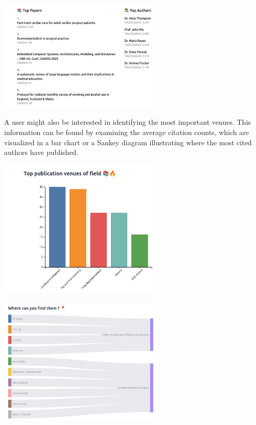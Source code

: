 \documentclass{article}
\begin{document}
\begin{center}
\includegraphics[width=0.6\textwidth]{./pictures/top_papers_top_authors.png}
\end{center}

A user might also be interested in identifying the most important venues.
This information can be found by examining the average citation counts,
which are visualized in a bar chart or a Sankey diagram illustrating where the most cited authors have published.
\begin{center}
\includegraphics[width=0.6\textwidth]{./pictures/top_publication_venues.png}
\end{center}

\begin{center}
\includegraphics[width=0.6\textwidth]{./pictures/sankey.png}
\end{center}
\end{document}
